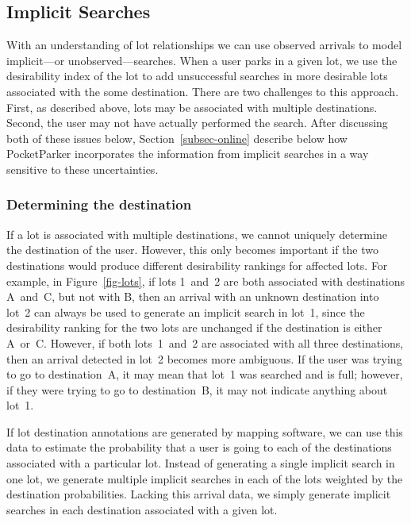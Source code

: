\subsection{Implicit Searches}
\label{subsec-implicit}

With an understanding of lot relationships we can use observed arrivals to
model implicit---or unobserved---searches. When a user parks in a given lot,
we use the desirability index of the lot to add unsuccessful searches in more
desirable lots associated with the some destination. There are two challenges
to this approach. First, as described above, lots may be associated with
multiple destinations. Second, the user may not have actually performed the
search. After discussing both of these issues below,
Section~\ref{subsec-online} describe below how PocketParker incorporates the
information from implicit searches in a way sensitive to these uncertainties.

\subsubsection{Determining the destination}

If a lot is associated with multiple destinations, we cannot uniquely
determine the destination of the user. However, this only becomes important
if the two destinations would produce different desirability rankings for
affected lots. For example, in Figure~\ref{fig-lots}, if lots 1~and~2 are
both associated with destinations A~and~C, but not with B, then an arrival
with an unknown destination into lot~2 can always be used to generate an
implicit search in lot~1, since the desirability ranking for the two lots are
unchanged if the destination is either A~or~C. However, if both lots~1~and~2
are associated with all three destinations, then an arrival detected in lot~2
becomes more ambiguous. If the user was trying to go to destination~A, it may
mean that lot~1 was searched and is full; however, if they were trying to go
to destination~B, it may not indicate anything about lot~1. 

If lot destination annotations are generated by mapping software, we can use
this data to estimate the probability that a user is going to each of the
destinations associated with a particular lot. Instead of generating a single
implicit search in one lot, we generate multiple implicit searches in each of
the lots weighted by the destination probabilities. Lacking this arrival
data, we simply generate implicit searches in each destination associated
with a given lot.

